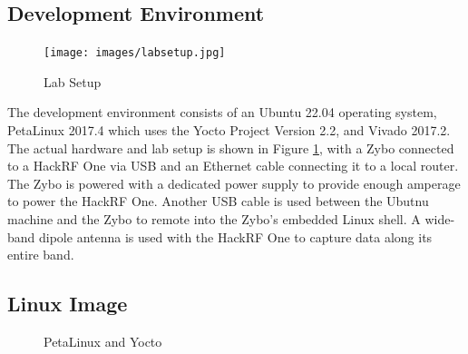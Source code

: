 \documentclass[conference]{IEEEtran}
\begin{document}
\subsection{Development Environment}
\begin{figure}[htbp]
  \centering
  \texttt{[image: images/labsetup.jpg]} %
  \caption{Lab Setup}
  \label{fig:labsetup}
\end{figure}
The development environment consists of an Ubuntu 22.04 operating system, PetaLinux 2017.4 which uses the Yocto Project Version 2.2, and Vivado 2017.2. The actual hardware and lab setup is shown in Figure \ref{fig:labsetup}, with a Zybo connected to a HackRF One via USB and an Ethernet cable connecting it to a local router. The Zybo is powered with a dedicated power supply to provide enough amperage to power the HackRF One. Another USB cable is used between the Ubutnu machine and the Zybo to remote into the Zybo's embedded Linux shell. A wide-band dipole antenna is used with the HackRF One to capture data along its entire band.

\subsection{Linux Image}
\begin{figure}[htbp]
  \centering
\caption{PetaLinux and Yocto}
\label{fig:petalinuxyocto}
\end{figure}
\end{document}
